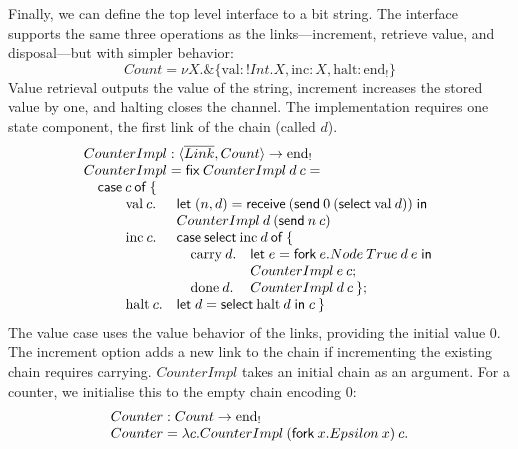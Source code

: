 \documentclass[orivec,envcountsame]{llncs}
\makeatletter
\newcommand{\with}{\mathbin\binampersand}
\newcommand{\gvdual}[1]{\overline{#1}}
\newcommand{\gvout}[2]{{!#1.#2}}
\newcommand{\uto}{\ensuremath{\rightarrow}}
\newcommand{\outterm}{\mathrm{end}_!}
\newcommand{\mkwd}[1]{\mathsf{#1}}
\newcommand{\link}[2]{#1 \leftrightarrow #2}
\newcommand{\rec}[1]{\mkwd{rec}\:#1}
\newcommand{\clabel}[1]{\mathrm{#1}}
\newcommand{\sel}[2]{#1[\clabel{#2}]}
\newcommand{\gvsend}[2]{\mkwd{send}\:#1\:#2}
\newcommand{\gvreceive}[1]{\mkwd{receive}\:#1}
\newcommand{\gvlet}[3]{\mkwd{let}\;#1 = #2\;\mkwd{in}\;#3}
\newcommand{\gvselect}[2]{\mkwd{select}\:#1\:#2}
\newcommand{\gvfork}[2]{\mkwd{fork}\:#1.#2}
\newcommand{\lrkwd}{\mkwd{fix}}
\newcommand{\ba}{\begin{array}}
\newcommand{\ea}{\end{array}}
\newcommand{\bl}{\ba[t]{@{}l@{}}}
\newcommand{\el}{\ea}
\makeatother
\begin{document}
Finally, we can define the top level interface to a bit string.  The interface supports the same
three operations as the links---increment, retrieve value, and disposal---but with simpler behavior:
\[
  Count = \nu X. \with \{ \clabel{val}: \gvout{Int}{X}, \clabel{inc}: X, \clabel{halt}: \outterm \}
\]
Value retrieval outputs the value of the string, increment increases the stored value by one, and
halting closes the channel. The implementation requires one state component, the first link of the
chain (called $d$).
\[\begin{array}{llll}
\mcl{4}{CounterImpl : \langle \gvdual{Link}, Count \rangle \uto \outterm} \\
\mcl{4}{CounterImpl = \lrkwd\:CounterImpl\:d\:c =} \\
\mcl{4}{\quad \mkwd{case}\:c\:\mkwd{of}\:\{} \\
\quad \quad & \clabel{val}\:c. & \mcl{2}{\gvlet{(n,d)}{\gvreceive{(\gvsend{0}{(\gvselect{\clabel{val}}{d})})}}} \\
& & \mcl{2}{CounterImpl\:d\:(\gvsend{n}{c})} \\
& \clabel{inc}\:c. & \mcl{2}{\mkwd{case}\:\gvselect{\clabel{inc}}{d}\:\mkwd{of}\:\{} \\
& & \quad \clabel{carry}\:d. & \gvlet{e}{\gvfork{e}{Node\:True\:d\:e}}{} \\
& & & CounterImpl\:e\:c; \\
& & \quad \clabel{done}\:d. & CounterImpl\:d\:c\:\}; \\
& \clabel{halt}\:c. & \mcl{2}{\gvlet{d}{\gvselect{\clabel{halt}}{d}}{c}\:\}}
\end{array}\]
The value case uses the value behavior of the links, providing the initial value 0.  The increment
option adds a new link to the chain if incrementing the existing chain requires
carrying. $CounterImpl$ takes an initial chain as an argument. For a counter, we initialise this to
the empty chain encoding $0$:
\[\bl
  Counter : Count \uto \outterm \\
  Counter = \lambda c.CounterImpl\:(\gvfork{x}{Epsilon\:x})\:c. \\
\el\]
%
%
\end{document}
